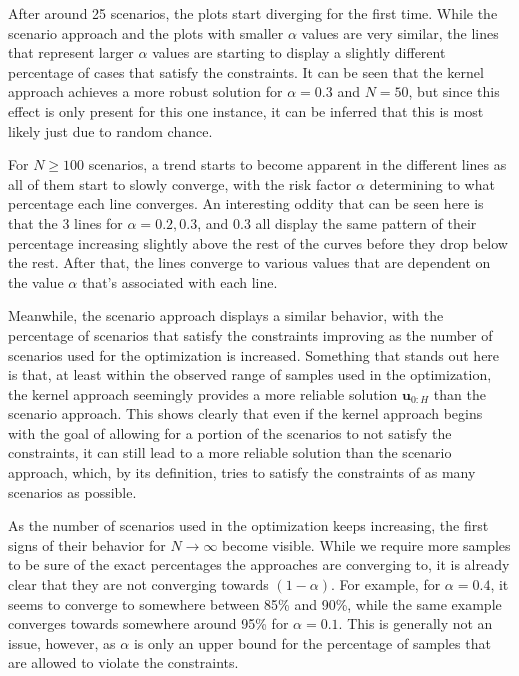 After around 25 scenarios, the plots start diverging for the first time. While the scenario approach and the plots with smaller $\alpha$ values are very similar, the lines that represent larger $\alpha$ values are starting to display a slightly different percentage of cases that satisfy the constraints. It can be seen that the kernel approach achieves a more robust solution for $\alpha = 0.3$ and $N = 50$, but since this effect is only present for this one instance, it can be inferred that this is most likely just due to random chance.

For $N \geq 100$ scenarios, a trend starts to become apparent in the different lines as all of them start to slowly converge, with the risk factor $\alpha$ determining to what percentage each line converges. An interesting oddity that can be seen here is that the 3 lines for $\alpha = 0.2, 0.3$, and $0.3$ all display the same pattern of their percentage increasing slightly above the rest of the curves before they drop below the rest. After that, the lines converge to various values that are dependent on the value $\alpha$ that's associated with each line.

Meanwhile, the scenario approach displays a similar behavior, with the percentage of scenarios that satisfy the constraints improving as the number of scenarios used for the optimization is increased. Something that stands out here is that, at least within the observed range of samples used in the optimization, the kernel approach seemingly provides a more reliable solution $\boldsymbol{u}_{0:H}$ than the scenario approach. This shows clearly that even if the kernel approach begins with the goal of allowing for a portion of the scenarios to not satisfy the constraints, it can still lead to a more reliable solution than the scenario approach, which, by its definition, tries to satisfy the constraints of as many scenarios as possible.

As the number of scenarios used in the optimization keeps increasing, the first signs of their behavior for $N \to \infty$ become visible. While we require more samples to be sure of the exact percentages the approaches are converging to, it is already clear that they are not converging towards $(1 - \alpha)$. For example, for $\alpha = 0.4$, it seems to converge to somewhere between 85\% and 90\%, while the same example converges towards somewhere around 95\% for $\alpha = 0.1$. This is generally not an issue, however, as $\alpha$ is only an upper bound for the percentage of samples that are allowed to violate the constraints.
 

